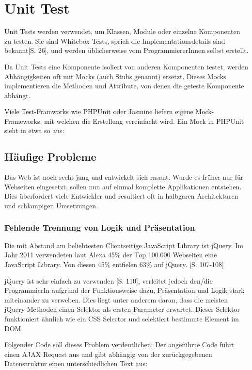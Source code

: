 \documentclass[a4paper,bibtotoc,oneside]{scrbook}
\begin{document}
\chapter{Unit Test}
Unit Tests werden verwendet, um Klassen, Module oder einzelne Komponenten zu testen. Sie sind Whitebox Tests, sprich die Implementationsdetails sind bekannt\cite{betrieb}[S. 26], und werden üblicherweise vom ProgrammiererInnen selbst erstellt. 

Da Unit Tests eine Komponente isoliert von anderen Komponenten testet, werden Abhängigkeiten oft mit Mocks (auch Stubs genannt) ersetzt. Dieses Mocks implementieren die Methoden und Attribute, von denen die geteste Komponente abhängt. 

Viele Test-Framworks wie PHPUnit oder Jasmine liefern eigene Mock-Frameworks, mit welchen die Erstellung vereinfacht wird. Ein Mock in PHPUnit sieht in etwa so aus:



\section{Häufige Probleme}
Das Web ist noch recht jung und entwickelt sich rasant. Wurde es früher nur für Webseiten eingesetzt, sollen nun auf einmal komplette Applikationen entstehen. Dies überfordert viele Entwickler und resultiert oft in halbgaren Architekturen und schlampigen Umsetzungen. 


\subsection{Fehlende Trennung von Logik und Präsentation}
Die mit Abstand am beliebtesten Clientseitige JavaScript Library ist jQuery. Im Jahr 2011 verwendeten laut Alexa 45\% der Top 100.000 Webseiten eine JavaScript Library. Von diesen 45\% entfielen 63\% auf jQuery. \cite{jquery}[S. 107-108]

jQuery ist sehr einfach zu verwenden \cite{jquery}[S. 110], verleitet jedoch den/die ProgrammierIn aufgrund der Funktionsweise dazu, Präsentation und Logik stark miteinander zu verweben. Dies liegt unter anderem daran, dass die meisten jQuery-Methoden einen Selektor als ersten Parameter erwartet. Dieser Selektor funktioniert ähnlich wie ein CSS Selector und selektiert bestimmte Element im DOM. \cite{jquery_selectors}

Folgender Code soll dieses Problem verdeutlichen: Der angeführte Code führt einen AJAX Request aus und gibt abhängig von der zurückgegebenen Datenstruktur einen unterschiedlichen Text aus:
\end{document}
